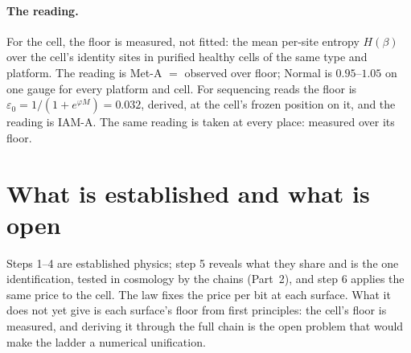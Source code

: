 \paragraph{The reading.} For the cell, the floor is measured, not fitted: the mean per-site entropy $H(\beta)$ over the cell's identity sites in
purified healthy cells of the same type and platform. The reading is Met-A $=$ observed over floor; Normal is $0.95$--$1.05$ on one gauge for every
platform and cell. For sequencing reads the floor is $\varepsilon_0=1/(1+e^{\varphi M})=0.032$, derived, at the cell's frozen position on it, and the reading is
IAM-A. The same reading is taken at every
place: measured over its floor.

\section{What is established and what is open}
Steps 1--4 are established physics; step 5 reveals what they share and is the one identification, tested in cosmology by the chains (Part~2), and step 6 applies the same
price to the cell. The law fixes the price per bit at each surface. What it does not yet give is each surface's floor from first principles: the
cell's floor is measured, and deriving it through the full chain is the open problem that would make the ladder a numerical unification.
